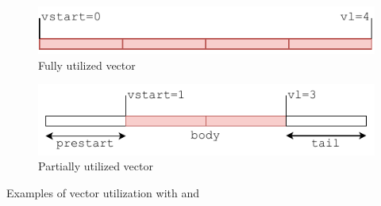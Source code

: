 \figcheckinputs{}
\expandafter\figure\expandafter[\figinputPos]
    \centering
    \begin{subfigure}[b]{\figinputWidth}
        \centering
        \includegraphics[width=\textwidth]{Figures/RVV_VL_full.pdf}
        \caption{Fully utilized vector}
        \label{fig:RVV_vl_full}
    \end{subfigure}
    \hfill
    \begin{subfigure}[b]{\figinputWidth}
        \centering
        \includegraphics[width=\textwidth]{Figures/RVV_VL_short.pdf}
        \caption{Partially utilized vector}
        \label{fig:RVV_vl_short}
    \end{subfigure}
    \caption{Examples of vector utilization with  and }
    \label{fig:RVV_vl}
\endfigure